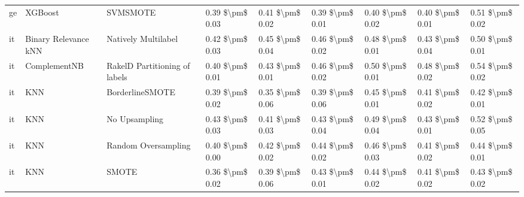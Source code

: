 \begin{tabular}{lllllllll}
      ge &                         XGBoost &                      SVMSMOTE & 0.39 \$\textbackslash pm\$ 0.03 &           0.41 \$\textbackslash pm\$ 0.02 &       0.39 \$\textbackslash pm\$ 0.01 &        0.40 \$\textbackslash pm\$ 0.02 &                         0.40 \$\textbackslash pm\$ 0.01 &     0.51 \$\textbackslash pm\$ 0.02 \\
      it &            Binary Relevance kNN &           Natively Multilabel & 0.42 \$\textbackslash pm\$ 0.03 &           0.45 \$\textbackslash pm\$ 0.04 &       0.46 \$\textbackslash pm\$ 0.02 &        0.48 \$\textbackslash pm\$ 0.01 &                         0.43 \$\textbackslash pm\$ 0.04 &     0.50 \$\textbackslash pm\$ 0.01 \\
      it &                    ComplementNB & RakelD Partitioning of labels & 0.40 \$\textbackslash pm\$ 0.01 &           0.43 \$\textbackslash pm\$ 0.01 &       0.46 \$\textbackslash pm\$ 0.02 &        0.50 \$\textbackslash pm\$ 0.01 &                         0.48 \$\textbackslash pm\$ 0.02 &     0.54 \$\textbackslash pm\$ 0.02 \\
      it &                             KNN &               BorderlineSMOTE & 0.39 \$\textbackslash pm\$ 0.02 &           0.35 \$\textbackslash pm\$ 0.06 &       0.39 \$\textbackslash pm\$ 0.06 &        0.45 \$\textbackslash pm\$ 0.01 &                         0.41 \$\textbackslash pm\$ 0.02 &     0.42 \$\textbackslash pm\$ 0.01 \\
      it &                             KNN &                 No Upsampling & 0.43 \$\textbackslash pm\$ 0.03 &           0.41 \$\textbackslash pm\$ 0.03 &       0.43 \$\textbackslash pm\$ 0.04 &        0.49 \$\textbackslash pm\$ 0.04 &                         0.43 \$\textbackslash pm\$ 0.01 &     0.52 \$\textbackslash pm\$ 0.05 \\
      it &                             KNN &           Random Oversampling & 0.40 \$\textbackslash pm\$ 0.00 &           0.42 \$\textbackslash pm\$ 0.02 &       0.44 \$\textbackslash pm\$ 0.02 &        0.46 \$\textbackslash pm\$ 0.03 &                         0.41 \$\textbackslash pm\$ 0.02 &     0.44 \$\textbackslash pm\$ 0.01 \\
      it &                             KNN &                         SMOTE & 0.36 \$\textbackslash pm\$ 0.02 &           0.39 \$\textbackslash pm\$ 0.06 &       0.43 \$\textbackslash pm\$ 0.01 &        0.44 \$\textbackslash pm\$ 0.02 &                         0.41 \$\textbackslash pm\$ 0.02 &     0.43 \$\textbackslash pm\$ 0.02 \\

\end{tabular}
